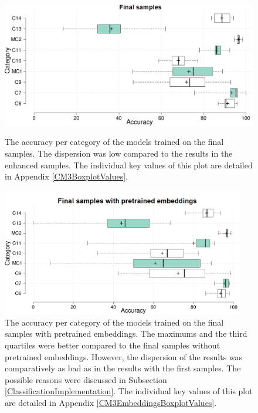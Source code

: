 \begin{figure}[]
 \begin{minipage}[t]{\textwidth}
    \centering
    \includegraphics[width =\textwidth]{Images/CM3Boxplot.png}
    \caption{The accuracy per category of the models trained on the final samples. The dispersion was low compared to the results in the enhanced samples. The individual key values of this plot are detailed in Appendix \ref{CM3BoxplotValues}.}
    \label{CM3Boxplot}
\end{minipage}

 \begin{minipage}[b]{\textwidth}
    \centering
    \includegraphics[width =0.95\textwidth]{Images/CM3EmbeddingsBoxplot.png}
    \caption{The accuracy per category of the models trained on the final samples with pretrained embeddings. The maximums and the third quartiles were better compared to the final samples without pretrained embeddings. However, the dispersion of the results was comparatively as bad as in the results with the first samples. The possible reasons were discussed in Subsection \ref{ClassificationImplementation}. The individual key values of this plot are detailed in Appendix \ref{CM3EmbeddingsBoxplotValues}.}
    \label{CM3EmbeddingsBoxplot}
\end{minipage}
\end{figure} \hfill

